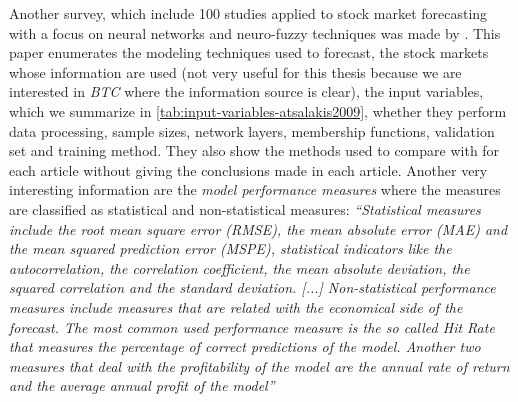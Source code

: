 Another survey, which include 100 studies applied to stock market
forecasting with a focus on neural networks and neuro-fuzzy techniques
was made by \cite{atsalakis2009surveying}. This paper enumerates the
modeling techniques used to forecast, the stock markets whose
information are used (not very useful for this thesis because we are
interested in \textit{BTC} where the information source is clear),
the input variables, which we summarize in
\autoref{tab:input-variables-atsalakis2009}, whether they perform data
processing, sample sizes, network layers, membership functions,
validation set and training method. They also show the methods used to
compare with for each article without giving the conclusions made in
each article. Another very interesting information are the
\textit{model performance measures} where the measures are classified
as statistical and non-statistical measures: \textit{``Statistical
  measures include the root mean square error (RMSE), the mean
  absolute error (MAE) and the mean squared prediction error (MSPE),
  statistical indicators like the autocorrelation, the correlation
  coefficient, the mean absolute deviation, the squared correlation
  and the standard deviation. [...] Non-statistical performance
  measures include measures that are related with the economical side
  of the forecast. The most common used performance measure is the so
  called Hit Rate that measures the percentage of correct predictions
  of the model. Another two measures that deal with the profitability
  of the model are the annual rate of return and the average annual
  profit of the model''}


